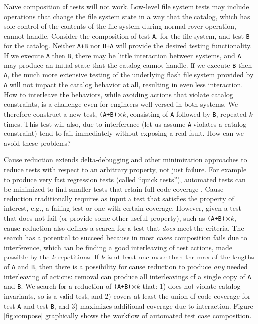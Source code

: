 Na\"ive composition of tests will not work.  Low-level file system tests may
include operations that change the file system state in a way that the
catalog, which has sole control of the contents of the file system during normal rover operation, cannot handle.
Consider the composition of test {\tt A}, for the file system, and
test {\tt B} for the catalog.  Neither {\tt A+B} nor {\tt B+A} will provide the desired
testing functionality.  If we execute {\tt A} then {\tt B}, there may be little
interaction between systems, and {\tt A} may produce an initial state
that the catalog cannot handle.  If we execute {\tt B} then {\tt A},
the much more extensive testing of the underlying flash file system
provided by {\tt A} will not impact the catalog behavior at all, resulting
in even less interaction.  How to interleave the behaviors, while
avoiding actions that violate catalog constraints, is a challenge
even for engineers well-versed in both systems.  We therefore
construct a new test, {\tt (A+B)}$\times k$, consisting of {\tt A}
followed by {\tt B}, repeated $k$ times.  This test will also, due to
interference (let us assume {\tt A} violates a catalog constraint) tend to
fail immediately without exposing a real fault. How can we avoid these problems?

Cause reduction \cite{stvrcausereduce} extends
delta-debugging \cite{DD} and other minimization approaches to reduce tests with
respect to an arbitrary property, not just failure.  For example to produce very fast
regression tests (called ``quick tests''), automated tests can be
minimized to find smaller tests that retain full code coverage \cite{stvrcausereduce}.    
Cause reduction traditionally requires as
input a test that satisfies the property of interest, e.g., a failing
test or one with certain coverage.  However, given a test that does not fail (or provide some other useful property), such as {\tt (A+B)}$\times k$, cause reduction also defines a search for a test that \emph{does} meet the criteria.  The search has a potential
to succeed because in most cases composition fails due to
interference, which can be finding a good interleaving of test actions, made possible
by the $k$ repetitions.  If $k$ is at least one more than the max of the lengths of {\tt A} and {\tt B}, then there is a possibility for cause reduction to produce \emph{any} needed interleaving of actions: removal can produce all interleavings of a single copy of {\tt A} and {\tt B}.  We search for a reduction of {\tt (A+B)}$\times k$ that: 1) does not violate catalog invariants, so is a valid test,  and 2) covers at least the union of code coverage for test {\tt A} and test {\tt B}, and 3) maximizes additional coverage due to interaction.  Figure \ref{fig:compose} graphically shows the workflow of automated test case composition.


